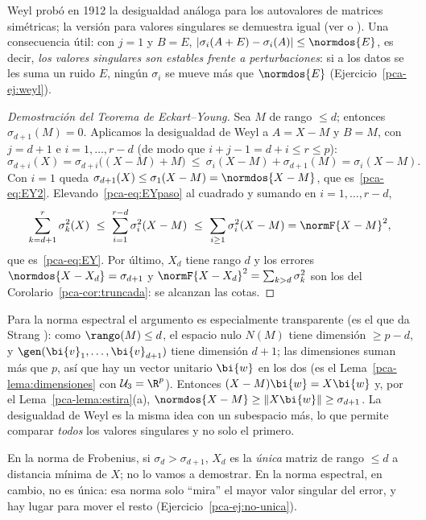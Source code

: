 \begin{remark}
Weyl probó en 1912 la desigualdad análoga para los autovalores de matrices
simétricas; la versión para valores singulares se demuestra igual
(ver \cite{HornJohnson2013} o \cite{Bhatia1997}). Una consecuencia útil:
con $j=1$ y $B=E$,
$|\sigma_i(A+E)-\sigma_i(A)|\le\normdos{E}$, es decir, \emph{los valores
singulares son estables frente a perturbaciones}: si a los datos se les suma
un ruido $E$, ningún $\sigma_i$ se mueve más que $\normdos{E}$
(Ejercicio~\ref{pca-ej:weyl}).
\end{remark}

\begin{proof}[Demostración del Teorema de Eckart--Young]
Sea $M$ de rango $\le d$; entonces $\sigma_{d+1}(M)=0$. Aplicamos la
desigualdad de Weyl a $A=X-M$ y $B=M$, con $j=d+1$ e $i=1,\dots,r-d$ (de modo
que $i+j-1=d+i\le r\le p$):
\begin{equation}\label{pca-eq:EYpaso}
\sigma_{d+i}(X)=\sigma_{d+i}\bigl((X-M)+M\bigr)
\ \le\ \sigma_i(X-M)+\sigma_{d+1}(M)=\sigma_i(X-M).
\end{equation}
Con $i=1$ queda $\sigma_{d+1}(X)\le\sigma_1(X-M)=\normdos{X-M}$, que
es~\eqref{pca-eq:EY2}. Elevando~\eqref{pca-eq:EYpaso} al cuadrado y sumando en
$i=1,\dots,r-d$,
\[
\sum_{k=d+1}^{r}\sigma_k^2(X)\ \le\ \sum_{i=1}^{r-d}\sigma_i^2(X-M)
\ \le\ \sum_{i\ge1}\sigma_i^2(X-M)=\normF{X-M}^2 ,
\]
que es~\eqref{pca-eq:EY}. Por último, $X_d$ tiene rango $d$ y los errores
$\normdos{X-X_d}=\sigma_{d+1}$ y $\normF{X-X_d}^2=\sum_{k>d}\sigma_k^2$ son los
del Corolario~\ref{pca-cor:truncada}: se alcanzan las cotas.
\end{proof}

\begin{remark}
Para la norma espectral el argumento es especialmente transparente (es el que
da Strang \cite{Strang2019}): como $\rango(M)\le d$, el espacio nulo $N(M)$
tiene dimensión $\ge p-d$, y $\gen(\bi{v}_1,\dots,\bi{v}_{d+1})$ tiene dimensión $d+1$;
las dimensiones suman más que $p$, así que hay un vector unitario $\bi{w}$ en los
dos (es el Lema~\ref{pca-lema:dimensiones} con $\mathcal U_3=\R^p$). Entonces $(X-M)\bi{w}=X\bi{w}$ y, por el Lema~\ref{pca-lema:estira}(a),
$\normdos{X-M}\ge\|X\bi{w}\|\ge\sigma_{d+1}$. La desigualdad de Weyl es la misma
idea con un subespacio más, lo que permite comparar \emph{todos} los valores
singulares y no solo el primero.
\end{remark}

\begin{remark}\label{pca-rem:unicidadEY}
En la norma de Frobenius, si $\sigma_d>\sigma_{d+1}$, $X_d$ es la \emph{única}
matriz de rango $\le d$ a distancia mínima de $X$; no lo vamos a demostrar. En
la norma espectral, en cambio, no es única: esa norma solo ``mira'' el mayor
valor singular del error, y hay lugar para mover el resto
(Ejercicio~\ref{pca-ej:no-unica}).
\end{remark}

